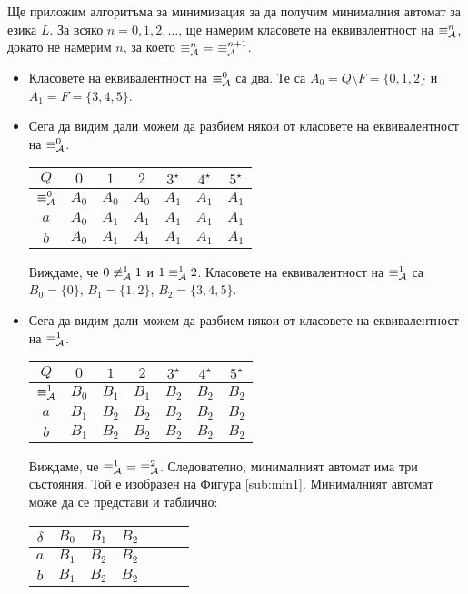 \begin{example}
Ще приложим алгоритъма за минимизация за да получим минималния автомат за езика $L$.
За всяко $n = 0,1,2,\dots$, ще намерим класовете на еквивалентност на $\equiv^n_{\mathcal{A}}$,
докато не намерим $n$, за което $\equiv^n_\A\ =\ \equiv^{n+1}_\A$.

\begin{itemize}
\item 
  Класовете на еквивалентност на $\equiv^0_{\mathcal{A}}$ са два.
  Те са $A_0 = Q\setminus F = \{0,1,2\}$ и $A_1 = F = \{3,4,5\}$.
\item
  Сега да видим дали можем да разбием някои от класовете на еквивалентност на $\equiv^0_{\mathcal{A}}$.
  
  \begin{tabular}{|c|c|c|c|c|c|c|}
    \hline
    $Q$ & $0$ & $1$ & $2$ & $3^\star$ & $4^\star$ & $5^\star$ \\
    \hline
    \hline
    $\equiv^0_{\mathcal{A}}$ & $A_0$ & $A_0$ & $A_0$ & $A_1$ & $A_1$ & $A_1$\\
    \hline
    $a$ & $A_0$& $A_1$ & $A_1$ & $A_1$ & $A_1$ & $A_1$\\
    \hline
    $b$ & $A_0$& $A_1$ & $A_1$ & $A_1$ & $A_1$ & $A_1$\\
    \hline
  \end{tabular}

  Виждаме, че $0 \not\equiv^1_{\mathcal{A}} 1$ и $1 \equiv^1_{\mathcal{A}} 2$.
  Класовете на еквивалентност на $\equiv^1_{\mathcal{A}}$ са 
  $B_0 = \{0\}$, $B_1 = \{1,2\}$, $B_2 = \{3,4,5\}$.
\item
  Сега да видим дали можем да разбием някои от класовете на еквивалентност на $\equiv^1_{\mathcal{A}}$.
  
  \begin{tabular}{|c|c|c|c|c|c|c|}
    \hline
    $Q$ & $0$ & $1$ & $2$ & $3^\star$ & $4^\star$ & $5^\star$ \\
    \hline
    \hline
    $\equiv^1_{\mathcal{A}}$ & $B_0$ & $B_1$ & $B_1$ & $B_2$ & $B_2$ & $B_2$\\
    \hline
    $a$ & $B_1$ & $B_2$ & $B_2$ & $B_2$ & $B_2$ & $B_2$\\
    \hline
    $b$ & $B_1$ & $B_2$ & $B_2$ & $B_2$ & $B_2$ & $B_2$\\
    \hline
  \end{tabular}

  Виждаме, че $\equiv^1_\A\ =\ \equiv^2_\A$.
  Следователно, минималният автомат има три състояния.
  Той е изобразен на Фигура \ref{sub:min1}.  
  Минималният автомат може да се представи и таблично:
  
  \begin{tabular}{|c|c|c|c|c|c|c|}
    \hline
    $\delta$ & $B_0$ & $B_1$ & $B_2$ \\
    \hline
    $a$ & $B_1$ & $B_2$ & $B_2$ \\
    \hline
    $b$ & $B_1$ & $B_2$ & $B_2$ \\
    \hline
  \end{tabular}
\end{itemize}
\end{example}

